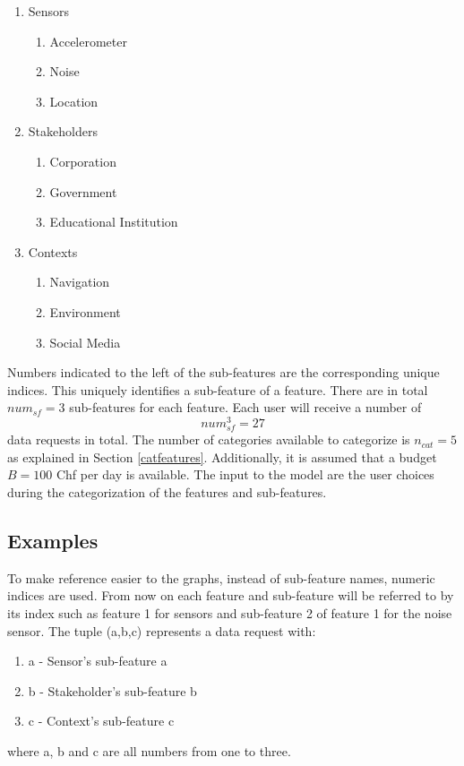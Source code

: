 \begin{enumerate}
    \item Sensors
    \begin{enumerate}
    \item Accelerometer 
    \item Noise 
    \item Location 
   \end{enumerate}
    \item Stakeholders 
    \begin{enumerate}
    \item Corporation 
    \item Government 
    \item Educational Institution 
   \end{enumerate}
   \item Contexts
    \begin{enumerate}
    \item Navigation 
    \item Environment 
    \item Social Media 
   \end{enumerate}
 \end{enumerate}
 
Numbers indicated to the left of the sub-features are the corresponding unique indices. This uniquely identifies a sub-feature of a feature. There are in total $num_{sf}=3$ sub-features for each feature.
Each user will receive a number of $$num_{sf}^3=27$$ data requests in total. The number of categories available to categorize is $n_{cat}=5$ as explained in Section \ref{catfeatures}. Additionally, it is assumed that a budget $B=100$ Chf per day is available. 
The input to the model are the user choices during the categorization of the features and sub-features.

\subsection{Examples}

To make reference easier to the graphs, instead of sub-feature names, numeric indices are used. From now on each feature and sub-feature will be referred to by its index such as feature 1 for sensors and sub-feature 2 of feature 1 for the noise sensor. The tuple (a,b,c) represents a data request with:
\begin{enumerate}
    \item a - Sensor's sub-feature a
    \item b - Stakeholder's sub-feature b
    \item c - Context's sub-feature c
   \end{enumerate}
where a, b and c are all numbers from one to three. 


